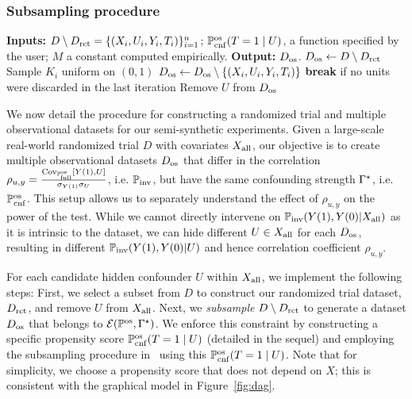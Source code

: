 \subsubsection{Subsampling procedure}


\begin{algorithm}
\caption{Randomized Trial Rejection Sampling \citep{keith2023rct}}
\label{algo:rejection}
\begin{algorithmic}[1]
\State \textbf{Inputs:} $D \setminus D_{\operatorname{rct}} = \{(X_i, U_i, Y_i,T_i)\}_{i=1}^{n}$; $\mathbb{P}_{\operatorname{cnf}}^{\operatorname{os}}(T = 1 \mid U)$, a function specified by the user; $M$ 
a constant computed empirically.
\State \textbf{Output:} $D_{\mathrm{os}}$.
\State $D_{\mathrm{os}} \leftarrow D \setminus D_{\operatorname{rct}}$
\State Sample $K_i$ uniform on $(0, 1)$
\State  $D_{\mathrm{os}} \leftarrow D_{\mathrm{os}} \setminus \{(X_i, U_i, Y_i,T_i)\}$
\EndIf
\EndFor
\State \textbf{break} if no units were discarded in the last iteration
\EndWhile
\State Remove $U$ from $D_{\mathrm{os}}$
\end{algorithmic}
\end{algorithm}


We now detail the procedure for constructing a randomized trial and multiple observational datasets for our semi-synthetic experiments. 
Given a large-scale real-world randomized trial $D$ with covariates $X_{\mathrm{all}}$, our objective is to create multiple observational datasets $D_{\mathrm{os}}$ that differ in the correlation $\rho_{u,y} = \frac{\operatorname{Cov}_{\mathbb{P} ^{\operatorname{os}}_{\operatorname{full}}}[Y(1),U]}{\sigma_{Y(1)} \sigma_U}$, i.e. $\mathbb{P} _{\operatorname{inv}}$, but have the same confounding strength $\Gamma^{\star}$, i.e. $\mathbb{P}_{\operatorname{cnf}}^{\operatorname{os}}$. This setup allows us to separately understand the effect of $\rho_{u,y}$ on the power of the test. While we cannot directly intervene on $\mathbb{P} _{\operatorname{inv}} (Y(1), Y(0)|X_{\mathrm{all}})$ as it is intrinsic to the dataset, we can hide different $U \in X_{\mathrm{all}}$ for each $D_{\mathrm{os}}$, resulting in different  $\mathbb{P} _{\operatorname{inv}} (Y(1), Y(0)|U)$  and hence correlation coefficient $\rho_{u,y}$. 

For each candidate hidden confounder $U$ within $X_{\mathrm{all}}$, we implement the following steps:  First, we select a subset from $D$ to construct our randomized trial dataset, $D_{\operatorname{rct}}$, and remove $U$ from $X_{\mathrm{all}}$.  Next, we \emph{subsample} $D \setminus D_{\operatorname{rct}}$ to generate a dataset $D_{\mathrm{os}}$ that belongs to $\mathcal{E}(\mathbb{P}^{\operatorname{os}}, \Gamma^{\star})$. We enforce this constraint by constructing a specific propensity score $\mathbb{P}_{\operatorname{cnf}}^{\operatorname{os}}(T = 1\mid U)$  (detailed in the sequel) and employing the subsampling procedure in~ using this  $\mathbb{P}_{\operatorname{cnf}}^{\operatorname{os}}(T = 1\mid U)$. Note that for simplicity, we choose a propensity score that does not depend on $X$; this is consistent with the graphical model in Figure~\ref{fig:dag}.


